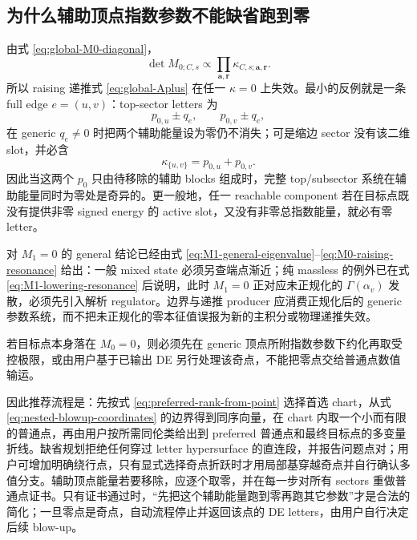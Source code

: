 \documentclass[11pt,a4paper]{ctexart}
\begin{document}
\subsection{为什么辅助顶点指数参数不能缺省跑到零}

由式 \eqref{eq:global-M0-diagonal}，
\begin{equation}
 \det M_{0;C,s}\propto
 \prod_{\bm a,\bm r}\kappa_{C,s;\bm a,\bm r}.
 \label{eq:M0-determinant-letters}
\end{equation}
所以 raising 递推式 \eqref{eq:global-Aplus} 在任一 $\kappa=0$ 上失效。最小的反例就是一条 full edge $e=(u,v)$：top-sector letters 为
\begin{equation}
 p_{0,u}\pm q_e,
 \qquad
 p_{0,v}\pm q_e,
 \end{equation}
在 generic $q_e\neq0$ 时把两个辅助能量设为零仍不消失；可是缩边 sector 没有该二维 slot，并必含
\begin{equation}
 \kappa_{\{u,v\}}=p_{0,u}+p_{0,v}.
 \label{eq:contracted-zero-letter}
\end{equation}
因此当这两个 $p_0$ 只由待移除的辅助 blocks 组成时，完整 top/subsector 系统在辅助能量同时为零处是奇异的。更一般地，任一 reachable component 若在目标点既没有提供非零 signed energy 的 active slot，又没有非零总指数能量，就必有零 letter。

对 $M_1=0$ 的 general 结论已经由式 \eqref{eq:M1-general-eigenvalue}--\eqref{eq:M0-raising-resonance} 给出：一般 mixed state 必须另查端点渐近；纯 massless 的例外已在式 \eqref{eq:M1-lowering-resonance} 后说明，此时 $M_1=0$ 正对应未正规化的 $\Gamma(\alpha_v)$ 发散，必须先引入解析 regulator。边界与递推 producer 应消费正规化后的 generic 参数系统，而不把未正规化的零本征值误报为新的主积分或物理递推失效。

若目标点本身落在 $M_0=0$，则必须先在 generic 顶点所附指数参数下约化再取受控极限，或由用户基于已输出 DE 另行处理该奇点，不能把零点交给普通点数值输运。

因此推荐流程是：先按式 \eqref{eq:preferred-rank-from-point} 选择首选 chart，从式 \eqref{eq:nested-blowup-coordinates} 的边界得到同序向量，在 chart 内取一个小而有限的普通点，再由用户按所需同伦类给出到 preferred 普通点和最终目标点的多变量折线。缺省规划拒绝任何穿过 letter hypersurface 的直连段，并报告问题点对；用户可增加明确绕行点，只有显式选择奇点折跃时才用局部基穿越奇点并自行确认多值分支。辅助顶点能量若要移除，应逐个取零，并在每一步对所有 sectors 重做普通点证书。只有证书通过时，“先把这个辅助能量跑到零再跑其它参数”才是合法的简化；一旦零点是奇点，自动流程停止并返回该点的 DE letters，由用户自行决定后续 blow-up。
\end{document}
